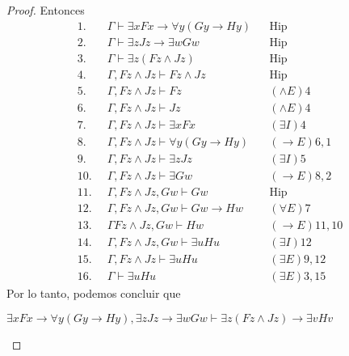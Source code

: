 \documentclass[letterpaper,12pt]{article}
\begin{document}
\begin{enumerate}
\begin{enumerate}
\begin{proof}
            Entonces
            \begin{align*}
                1. \; \; &\Gamma \vdash \exists x Fx \rightarrow 
                \forall y(Gy \rightarrow Hy)
                && \text{Hip} \\
                2. \; \; &\Gamma \vdash \exists z Jz \rightarrow 
                \exists w Gw
                && \text{Hip} \\
                3. \; \; &\Gamma \vdash \exists z(Fz \land Jz)
                && \text{Hip} \\
                4. \; \; &\Gamma, Fz \land Jz \vdash Fz \land Jz
                && \text{Hip} \\
                5. \; \; &\Gamma, Fz \land Jz \vdash Fz 
                && \text{$(\land E) 4$} \\
                6. \; \; &\Gamma, Fz \land Jz \vdash Jz
                && \text{$(\land E) 4$} \\
                7. \; \; &\Gamma, Fz \land Jz \vdash \exists x Fx
                && \text{$(\exists I) 4$} \\
                8. \; \; &\Gamma, Fz \land Jz \vdash \forall y(Gy 
                \rightarrow Hy)
                && \text{$(\rightarrow E) 6,1$} \\
                9. \; \; &\Gamma, Fz \land Jz \vdash \exists z Jz
                && \text{$(\exists I) 5$} \\
                10. \; \; &\Gamma, Fz \land Jz \vdash \exists Gw
                && \text{$(\rightarrow E) 8, 2$} \\
                11. \; \;  &\Gamma, Fz \land Jz, Gw \vdash Gw 
                && \text{Hip} \\
                12. \; \; &\Gamma, Fz \land Jz, Gw \vdash Gw \rightarrow Hw
                && \text{$(\forall E) 7$} \\
                13. \; \; &\Gamma Fz \land Jz, Gw \vdash Hw 
                && \text{$(\rightarrow E) 11,10$} \\
                14. \; \; &\Gamma, Fz \land Jz, Gw \vdash \exists u Hu
                && \text{$(\exists I) 12$} \\
                15. \; \; &\Gamma, Fz \land Jz \vdash \exists u Hu
                && \text{$(\exists E) 9, 12$} \\
                16. \; \; &\Gamma \vdash \exists u Hu 
                && \text{$(\exists E) 3, 15$}
            \end{align*}
            Por lo tanto, podemos concluir que 

            \begin{center}
                $\exists x Fx \rightarrow \forall y (Gy \rightarrow Hy),
                \exists z Jz \rightarrow \exists w Gw 
                \vdash \exists z (Fz \land Jz) \rightarrow \exists v Hv$
            \end{center}

        \end{proof}
    \end{enumerate}
\end{enumerate}
\end{document}
